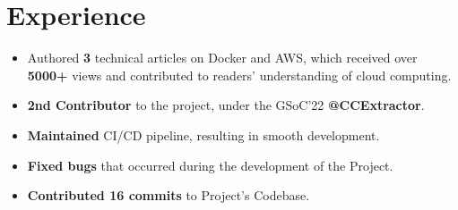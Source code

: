 \documentclass[]{deedy-resume-openfont}
\begin{document}
\hfill
\begin{minipage}[t]{0.66\textwidth} 


\section{Experience}
\vspace{\topsep}
\begin{itemize}[leftmargin=*]
    \item Authored \textbf{3} technical articles on Docker and AWS, which received over \textbf{5000+} views and contributed to readers’ understanding of cloud computing.
\end{itemize}

\sectionsep

\vspace{\topsep}
\begin{itemize}[leftmargin=*]
    \item \textbf{2nd Contributor} to the project, under the GSoC'22 \textbf{@CCExtractor}.
    \vspace{-2.6mm} %
    \item \textbf{Maintained} CI/CD pipeline, resulting in smooth development.
    \vspace{-2.6mm}
    \item \textbf{Fixed bugs} that occurred during the development of the Project.
    \vspace{-2.6mm}
    \item \textbf{Contributed 16 commits} to Project's Codebase.
\end{itemize}

\sectionsep


\end{minipage}
\end{document}
